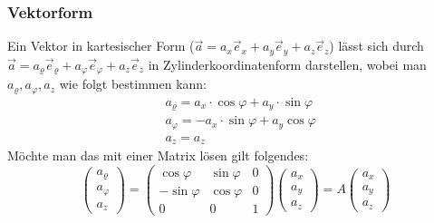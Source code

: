 \documentclass[a4paper,10pt]{scrartcl}
\begin{document}
            \subsubsection{Vektorform}
                Ein Vektor in kartesischer Form (\( \vec{a}= a_x\vec{e}_x + a_y\vec{e}_y + a_z\vec{e}_z \)) lässt sich durch \( \vec{a}= a_\varrho\vec{e}_\varrho + a_\varphi\vec{e}_\varphi + a_z\vec{e}_z \)
                in Zylinderkoordinatenform darstellen, wobei man \(a_\varrho, a_\varphi, a_z\) wie folgt bestimmen kann: 
                \begin{equation*}
                    \begin{aligned}
                        & a_\varrho = a_x \cdot \cos \varphi + a_y \cdot \sin \varphi \\
                        & a_\varphi = -a_x \cdot \sin \varphi + a_y \cos \varphi \\
                        & a_z = a_z
                    \end{aligned}
                \end{equation*}
                Möchte man das mit einer Matrix lösen gilt folgendes:   
                \begin{equation*}
                    \begin{pmatrix}
                        a_\varrho \\ a_\varphi \\ a_z
                    \end{pmatrix} = 
                    \begin{pmatrix}
                        \cos \varphi & \sin \varphi & 0 \\
                        -\sin \varphi & \cos \varphi & 0 \\
                        0 & 0 & 1
                    \end{pmatrix}
                    \begin{pmatrix}
                        a_x \\ a_y \\ a_z
                    \end{pmatrix} = A 
                    \begin{pmatrix}
                        a_x \\ a_y \\ a_z
                    \end{pmatrix}
                \end{equation*}     
            
\end{document}
